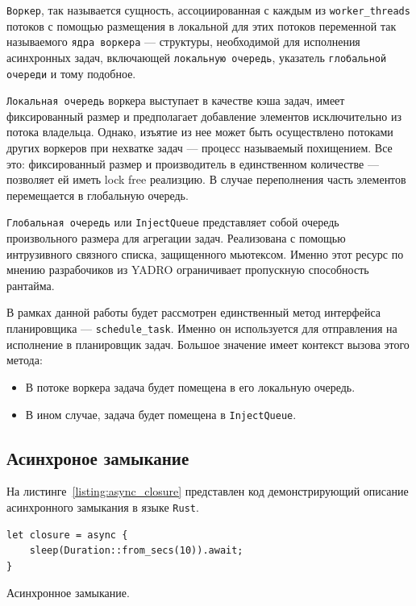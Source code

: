 \verb|Воркер|, так называется сущность, ассоциированная с каждым из \verb|worker_threads| потоков с помощью размещения в локальной для этих потоков переменной так называемого \verb|ядра воркера| --- структуры, необходимой для исполнения асинхронных задач, включающей \verb|локальную очередь|, указатель \verb|глобальной очереди| и тому подобное.

\verb|Локальная очередь| воркера выступает в качестве кэша задач, имеет фиксированный размер и предполагает добавление элементов  исключительно из потока владельца. Однако, изъятие из нее может быть осуществлено потоками других воркеров при нехватке задач --- процесс называемый похищением. Все это: фиксированный размер и производитель в единственном количестве --- позволяет ей иметь lock free реализцию. В случае переполнения часть элементов перемещается в глобальную очередь.

\verb|Глобальная очередь| или \verb|InjectQueue| представляет собой очередь произвольного размера для агрегации задач. Реализована с помощью интрузивного связного списка, защищенного мьютексом. Именно этот ресурс по мнению разрабочиков из YADRO ограничивает пропускную способность рантайма.

В рамках данной работы будет рассмотрен единственный метод интерфейса планировщика --- \verb|schedule_task|. Именно он используется для отправления на исполнение в планировщик задач. Большое значение имеет контекст вызова этого метода:

\begin{itemize}
    \item В потоке воркера задача будет помещена в его локальную очередь.
    \item В ином случае, задача будет помещена в \verb|InjectQueue|.
\end{itemize}

\subsection{Асинхроное замыкание}

На листинге~\ref{listing:async_closure} представлен код демонстрирующий описание асинхронного замыкания в языке \verb|Rust|.

\begin{listing}[H]
    \begin{verbatim}
let closure = async {
    sleep(Duration::from_secs(10)).await;
}
    \end{verbatim}

    \caption{Асинхронное замыкание.}
    \label{listing:async_closure}
\end{listing}

